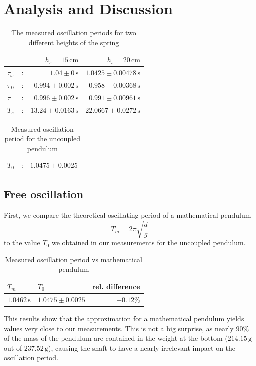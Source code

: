 \documentclass{scrreprt}
\newcommand{\unit}[1]{\ensuremath{\, \mathrm{#1}}}
\begin{document}
\section{Analysis and Discussion}

\begin{table}[H]
\centering
	\begin{tabular}{lcrr}
	&&$h_s = 15\unit{cm}$&$h_s = 20\unit{cm}$\\
	\hline	
	$\tau_\omega$&:&$1.04\pm 0 \unit{s}$&$1.0425\pm 0.00478\unit{s}$\\	
	$\tau_\Omega$&:&$0.994\pm 0.002 \unit{s}$&$0.958\pm 0.00368\unit{s}$\\
	$\tau$&:&$0.996\pm 0.002 \unit{s}$&$0.991\pm 0.00961\unit{s}$\\
	$T_s$&:&$13.24\pm 0.0163 \unit{s}$&$22.0667\pm 0.0272\unit{s}$\\
	\end{tabular}
	\caption{The measured oscillation periods for two different heights of the spring}
\end{table}
\begin{table}[H]
	\centering
	\begin{tabular}{lcr}
		$T_0$&:&$1.0475	\pm 0.0025$
	\end{tabular}
	\caption{Measured oscillation period for the uncoupled pendulum}
\end{table}

\subsection{Free oscillation}
First, we compare the theoretical oscillating period of a mathematical pendulum 
\begin{equation}
	T_m=2\pi\sqrt{\frac{d}{g}}
\end{equation}
to the value $T_0$ we obtained in our measurements for the uncoupled pendulum.
\begin{table}[H]
	\centering
	\begin{tabular}{llr}
		$T_m$&$T_0$&rel. difference\\ \hline
		$1.0462 \unit{s}$&$1.0475 \pm 0.0025$ & $+0.12\%$
	\end{tabular}
	\caption{Measured oscillation period vs mathematical pendulum}
\end{table}
This results show that the approximation for a mathematical pendulum yields values very close to our measurements. This is not a big surprise, as nearly $90\%$ of the mass of the pendulum are contained in the weight at the bottom ($214.15\unit{g}$ out of $237.52\unit{g}$), causing the shaft to have a nearly irrelevant impact on the oscillation period.
\end{document}
